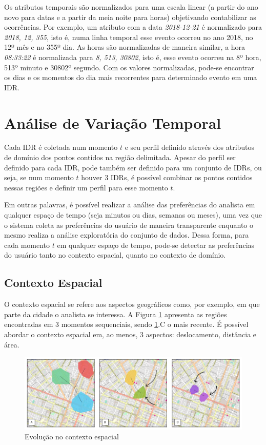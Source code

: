 Os atributos temporais são normalizados para uma escala linear (a partir do ano novo para datas e a partir da meia noite para horas) objetivando contabilizar as ocorrências. Por exemplo, um atributo com a data {\em 2018-12-21} é normalizado para {\em 2018, 12, 355}, isto é, numa linha temporal esse evento ocorreu no ano 2018, no 12º mês e no 355º dia. As horas são normalizadas de maneira similar, a hora {\em 08:33:22} é normalizada para {\em 8, 513, 30802}, isto é, esse evento ocorreu na 8º hora, 513º minuto e 30802º segundo. Com os valores normalizadas, pode-se encontrar os dias e os momentos do dia mais recorrentes para determinado evento em uma IDR.


\section{Análise de Variação Temporal}

Cada IDR é coletada num momento $t$ e seu perfil definido através dos atributos de domínio dos pontos contidos na região delimitada. Apesar do perfil ser definido para cada IDR, pode também ser definido para um conjunto de IDRs, ou seja, se num momento $t$ houver 3 IDRs, é possível combinar os pontos contidos nessas regiões e definir um perfil para esse momento $t$. 

Em outras palavras, é possível realizar a análise das preferências do analista em qualquer espaço de tempo (seja minutos ou dias, semanas ou meses), uma vez que o sistema coleta as preferências do usuário de maneira transparente enquanto o mesmo realiza a análise exploratória do conjunto de dados. Dessa forma, para cada momento $t$ em qualquer espaço de tempo, pode-se detectar as preferências do usuário tanto no contexto espacial, quanto no contexto de domínio.

\subsection{Contexto Espacial}

O contexto espacial se refere aos aspectos geográficos como, por exemplo, em que parte da cidade o analista se interessa. A Figura \ref{fig:analise-contexto-espacial} apresenta as regiões encontradas em 3 momentos sequenciais, sendo \ref{fig:analise-contexto-espacial}.C o mais recente. É possível abordar o contexto espacial em, ao menos, 3 aspectos: deslocamento, distância e área.

\begin{figure}[]
	\caption{Evolução no contexto espacial}
	\label{fig:analise-contexto-espacial}
	\centering
	\includegraphics[width=\textwidth]{imagens/analise-contexto-espacial}
	\mfonte
\end{figure}


